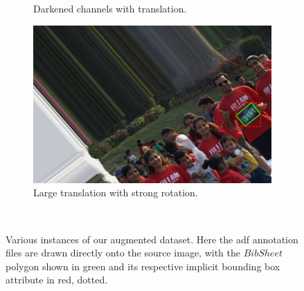 \begin{figure}[h!]
\begin{subfigure}[b]{0.475\textwidth}
    \caption{Darkened channels with translation.}
    \label{fig:dataset:postprocessing:augmentation:crop1}
  \end{subfigure}
  \hspace{\fill}
  \begin{subfigure}[b]{0.475\textwidth}
    \includegraphics[width=\textwidth]{images/dataset/augmentation/large_offset_rot}
    \caption{Large translation with strong rotation.}
    \label{fig:dataset:postprocessing:augmentation:crop2}
  \end{subfigure}
  \hspace{\fill}
  \bigskip
  \\ 
  \caption[Various augmented images from our dataset]{Various instances of our augmented dataset. Here the \gls{adf} annotation files are drawn directly onto the source image, with the $BibSheet$ polygon shown in green and its respective implicit bounding box attribute in red, dotted.}
  \label{fig:dataset:postprocessing:augmentation}
\end{figure}
